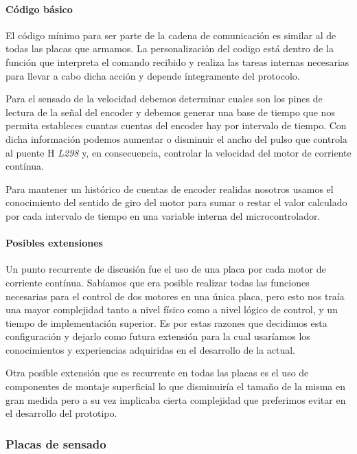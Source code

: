 \paragraph{C\'odigo b\'asico}
\label{h_placas_motorDC_codigo}

El c\'odigo m\'inimo para ser parte de la cadena de comunicaci\'on es similar al de todas las placas que
armamos.
La personalizaci\'on del codigo est\'a dentro de la funci\'on que interpreta el comando recibido y realiza
las tareas internas necesarias para llevar a cabo dicha acci\'on y depende \'integramente del protocolo.

Para el sensado de la velocidad debemos determinar cuales son los pines de lectura de la se\~nal del encoder
y debemos generar una base de tiempo que nos permita estableces cuantas cuentas del encoder hay por intervalo
de tiempo.
Con dicha informaci\'on podemos aumentar o disminuir el ancho del pulso que controla al puente H \emph{L298}
y, en consecuencia, controlar la velocidad del motor de corriente cont\'inua.

Para mantener un hist\'orico de cuentas de encoder realidas nosotros usamos el conocimiento del sentido de giro
del motor para sumar o restar el valor calculado por cada intervalo de tiempo en una variable interna del
microcontrolador.

\paragraph{Posibles extensiones}
\label{h_placas_motorDC_extensiones}

Un punto recurrente de discusi\'on fue el uso de una placa por cada motor de corriente cont\'inua.
Sab\'iamos que era posible realizar todas las funciones necesarias para el control de dos motores en una \'unica
placa, pero esto nos tra\'ia una mayor complejidad tanto a nivel f\'isico como a nivel l\'ogico de control, y un
tiempo de implementaci\'on superior.
Es por estas razones que decidimos esta configuraci\'on y dejarlo como futura extensi\'on para la cual usar\'iamos
los conocimientos y experiencias adquiridas en el desarrollo de la actual.

Otra posible extensi\'on que es recurrente en todas las placas es el uso de componentes de montaje superficial
lo que disminuir\'ia el tama\~no de la misma en gran medida pero a su vez implicaba cierta complejidad que preferimos
evitar en el desarrollo del prototipo.

\subsubsection{Placas de sensado}
\label{h_placas_sensado}


